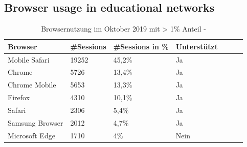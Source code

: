 %


\subsection{Browser usage in educational networks}
\begin{table}[!htb]
\begin{center}

	\begin{tabular}{|l|l|l|l|l|l|l|}
		\hline
		Browser	 		& \#Sessions & \#Sessions in \% 	& Unterstützt  \\ \hline
		Mobile Safari	& 19252 	 	 & 45,2\% 		  	& Ja 			\\ \hline 
		Chrome			& 5726	 	 & 13,4\% 		  	& Ja 			\\ \hline 
		Chrome Mobile	& 5653	 	 & 13,3\% 		  	& Ja 			\\ \hline 
		Firefox			& 4310	 	 & 10,1\% 		  	& Ja 			\\ \hline 
		Safari			& 2306	 	 & 5,4\% 		  	& Ja 			\\ \hline 
		Samsung Browser	& 2012 	 	 & 4,7\% 		  	& Ja 			\\ \hline 
		Microsoft Edge	& 1710 	 	 & 4\% 		  		& Nein 			\\ \hline 
	\end{tabular}
	\caption{Browsernutzung im Oktober 2019 mit > 1\% Anteil - \schulCloud}
	\label{table-browser-schule}
\end{center}
\end{table}

